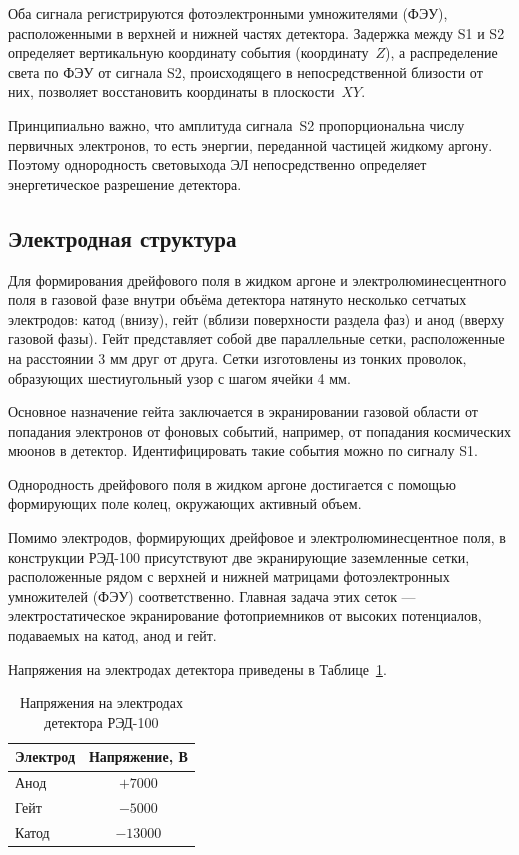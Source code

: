 \documentclass[12pt]{article}
\begin{document}
Оба сигнала регистрируются фотоэлектронными умножителями (ФЭУ),
расположенными в верхней и нижней частях детектора. Задержка между S1 и S2 определяет вертикальную координату события (координату~$Z$), а распределение света по ФЭУ от сигнала S2, происходящего в непосредственной близости от них, позволяет восстановить координаты в плоскости~$XY$.

Принципиально важно, что амплитуда сигнала~S2 пропорциональна числу
первичных электронов, то есть энергии, переданной частицей жидкому аргону.
Поэтому однородность световыхода ЭЛ непосредственно определяет
энергетическое разрешение детектора.

\subsection{Электродная структура}

Для формирования дрейфового поля в жидком аргоне и электролюминесцентного поля в газовой фазе внутри объёма детектора натянуто несколько сетчатых электродов: катод (внизу), гейт (вблизи поверхности раздела фаз) и анод (вверху газовой фазы). Гейт представляет собой две параллельные сетки, расположенные на расстоянии 3 мм друг от друга. Сетки изготовлены из тонких проволок, образующих шестиугольный узор с шагом ячейки 4 мм.

Основное назначение гейта заключается в
экранировании газовой области от попадания электронов от фоновых событий, например, от попадания космических мюонов в детектор. Идентифицировать такие события можно по сигналу S1.

Однородность дрейфового поля в жидком аргоне достигается с помощью формирующих поле колец, окружающих активный объем.

Помимо электродов, формирующих дрейфовое и электролюминесцентное поля, в конструкции РЭД-100 присутствуют две экранирующие заземленные сетки, расположенные рядом с верхней и нижней матрицами фотоэлектронных умножителей (ФЭУ) соответственно. Главная задача этих сеток — электростатическое экранирование фотоприемников от высоких потенциалов, подаваемых на катод, анод и гейт.

Напряжения на электродах детектора приведены в Таблице~\ref{tab:voltages}.

\begin{table}[h!]
  \centering
  \caption{Напряжения на электродах детектора РЭД-100}
  \label{tab:voltages}
  \begin{tabular}{|l|c|}
    \hline
    \textbf{Электрод} & \textbf{Напряжение, В} \\
    \hline
    Анод              & $+7000$                \\
    \hline
    Гейт             & $-5000$                \\
    \hline
    Катод             & $-13000$               \\
    \hline
  \end{tabular}
\end{table}
\end{document}
